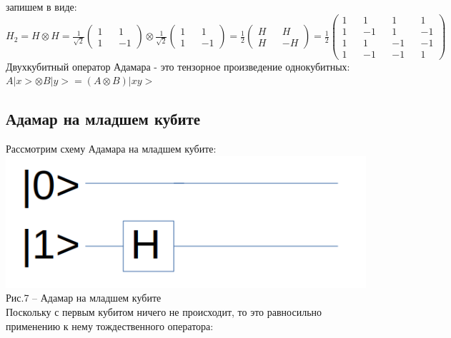 \documentclass[11pt]{report}
\begin{document}
запишем в виде: \\

$H_2 = H\otimes H = \frac{1}{\sqrt2}\begin{pmatrix}
1 && 1 \\
1 && -1\end{pmatrix} \otimes
\frac{1}{\sqrt2}\begin{pmatrix}
1 && 1 \\
1 && -1\end{pmatrix} = \frac{1}{2}\begin{pmatrix}
H && H \\
H && -H\end{pmatrix} = \frac{1}{2}\begin{pmatrix}
1 && 1 && 1 && 1 \\
1 && -1 && 1 && -1 \\
1 && 1 && -1 && -1 \\
1 && -1 && -1 && 1\end{pmatrix}$\\

Двухкубитный оператор Адамара - это тензорное произведение однокубитных:\\

$A|x> \otimes B|y> = (A\otimes B) | xy>$

\subsection{Адамар на младшем кубите}
Рассмотрим схему Адамара на младшем кубите: \\

\includegraphics[scale=0.2]{adamar_ml}\\
Рис.7 -- Адамар на младшем кубите \\

Поскольку с первым кубитом ничего не происходит, то это равносильно применению к нему тождественного оператора:\\
\end{document}
